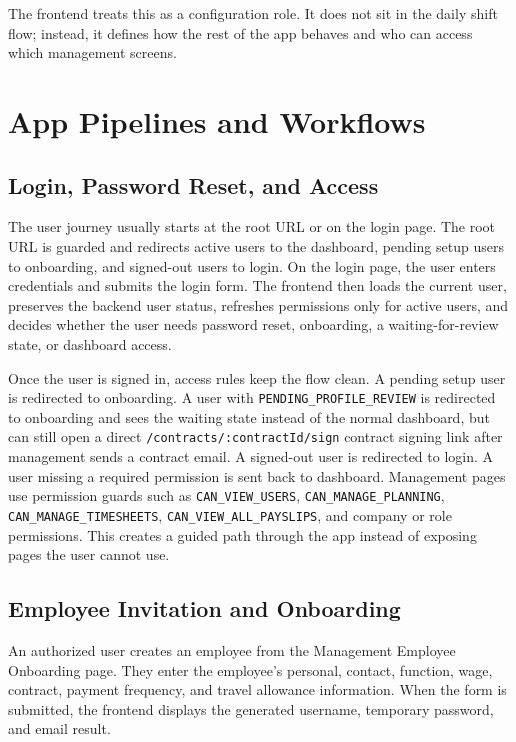 \documentclass[11pt]{article}
\newcommand{\code}[1]{\nolinkurl{#1}}
\begin{document}
The frontend treats this as a configuration role. It does not sit in the daily shift flow; instead, it defines how the rest of the app behaves and who can access which management screens.
\section{App Pipelines and Workflows}

\subsection{Login, Password Reset, and Access}

The user journey usually starts at the root URL or on the login page. The root URL is guarded and redirects active users to the dashboard, pending setup users to onboarding, and signed-out users to login. On the login page, the user enters credentials and submits the login form. The frontend then loads the current user, preserves the backend user status, refreshes permissions only for active users, and decides whether the user needs password reset, onboarding, a waiting-for-review state, or dashboard access.

Once the user is signed in, access rules keep the flow clean. A pending setup user is redirected to onboarding. A user with \code{PENDING_PROFILE_REVIEW} is redirected to onboarding and sees the waiting state instead of the normal dashboard, but can still open a direct \code{/contracts/:contractId/sign} contract signing link after management sends a contract email. A signed-out user is redirected to login. A user missing a required permission is sent back to dashboard. Management pages use permission guards such as \code{CAN_VIEW_USERS}, \code{CAN_MANAGE_PLANNING}, \code{CAN_MANAGE_TIMESHEETS}, \code{CAN_VIEW_ALL_PAYSLIPS}, and company or role permissions. This creates a guided path through the app instead of exposing pages the user cannot use.
\subsection{Employee Invitation and Onboarding}

An authorized user creates an employee from the Management Employee Onboarding page. They enter the employee's personal, contact, function, wage, contract, payment frequency, and travel allowance information. When the form is submitted, the frontend displays the generated username, temporary password, and email result.
\end{document}
